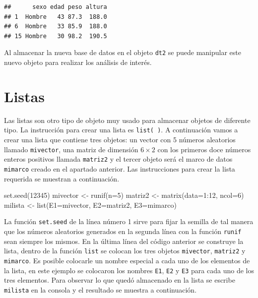 \documentclass[
]{book}
\makeatletter
\newenvironment{Shaded}{\begin{snugshade}}{\end{snugshade}}
\newcommand{\AttributeTok}[1]{\textcolor[rgb]{0.77,0.63,0.00}{#1}}
\newcommand{\DecValTok}[1]{\textcolor[rgb]{0.00,0.00,0.81}{#1}}
\newcommand{\FunctionTok}[1]{\textcolor[rgb]{0.00,0.00,0.00}{#1}}
\newcommand{\NormalTok}[1]{#1}
\newcommand{\OtherTok}[1]{\textcolor[rgb]{0.56,0.35,0.01}{#1}}
\newcommand{\SpecialCharTok}[1]{\textcolor[rgb]{0.00,0.00,0.00}{#1}}
\newenvironment{kframe}{%
\medskip{}
\setlength{\fboxsep}{.8em}
 \def\at@end@of@kframe{}%
 \ifinner\ifhmode%
  \def\at@end@of@kframe{\end{minipage}}%
  \begin{minipage}{\columnwidth}%
 \fi\fi%
 \def\FrameCommand##1{\hskip\@totalleftmargin \hskip-\fboxsep
 \colorbox{shadecolor}{##1}\hskip-\fboxsep
     \hskip-\linewidth \hskip-\@totalleftmargin \hskip\columnwidth}%
 \MakeFramed {\advance\hsize-\width
   \@totalleftmargin\z@ \linewidth\hsize
   \@setminipage}}%
 {\par\unskip\endMakeFramed%
 \at@end@of@kframe}
\renewenvironment{Shaded}{\begin{kframe}}{\end{kframe}}
\makeatother
\begin{document}
\begin{verbatim}
##      sexo edad peso altura
## 1  Hombre   43 87.3  188.0
## 6  Hombre   33 85.9  188.0
## 15 Hombre   30 98.2  190.5
\end{verbatim}

Al almacenar la nueva base de datos en el objeto \texttt{dt2} se puede manipular este nuevo objeto para realizar los análisis de interés.

\hypertarget{listas}{%
\section{\texorpdfstring{Listas  }{Listas  }}\label{listas}}

Las listas son otro tipo de objeto muy usado para almacenar objetos de diferente tipo. La instrucción para crear una lista es \texttt{list(\ )}. A continuación vamos a crear una lista que contiene tres objetos: un vector con 5 números aleatorios llamado \texttt{mivector}, una matriz de dimensión \(6 \times 2\) con los primeros doce números enteros positivos llamada \texttt{matriz2} y el tercer objeto será el marco de datos \texttt{mimarco} creado en el apartado anterior. Las instrucciones para crear la lista requerida se muestran a continuación.

\begin{Shaded}
\begin{Highlighting}[]
\FunctionTok{set.seed}\NormalTok{(}\DecValTok{12345}\NormalTok{)}
\NormalTok{mivector }\OtherTok{\textless{}{-}} \FunctionTok{runif}\NormalTok{(}\AttributeTok{n=}\DecValTok{5}\NormalTok{)}
\NormalTok{matriz2 }\OtherTok{\textless{}{-}} \FunctionTok{matrix}\NormalTok{(}\AttributeTok{data=}\DecValTok{1}\SpecialCharTok{:}\DecValTok{12}\NormalTok{, }\AttributeTok{ncol=}\DecValTok{6}\NormalTok{)}
\NormalTok{milista }\OtherTok{\textless{}{-}} \FunctionTok{list}\NormalTok{(}\AttributeTok{E1=}\NormalTok{mivector, }\AttributeTok{E2=}\NormalTok{matriz2, }\AttributeTok{E3=}\NormalTok{mimarco)}
\end{Highlighting}
\end{Shaded}

La función \texttt{set.seed} de la línea número 1 sirve para fijar la semilla de tal manera que los números aleatorios generados en la segunda línea con la función \texttt{runif} sean siempre los mismos. En la última línea del código anterior se construye la lista, dentro de la función \texttt{list} se colocan los tres objetos \texttt{mivector}, \texttt{matriz2} y \texttt{mimarco}. Es posible colocarle un nombre especial a cada uno de los elementos de la lista, en este ejemplo se colocaron los nombres \texttt{E1}, \texttt{E2} y \texttt{E3} para cada uno de los tres elementos. Para observar lo que quedó almacenado en la lista se escribe \texttt{milista} en la consola y el resultado se muestra a continuación.
\end{document}
